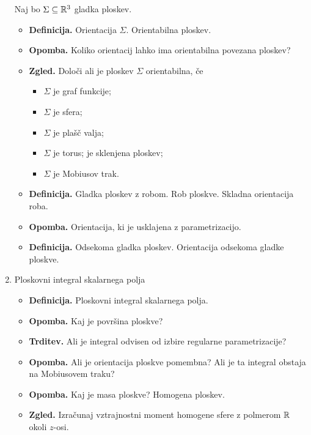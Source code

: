 \begin{enumerate}
    Naj bo \(\Sigma \subseteq \mathbb{R}^3\) gladka ploskev.
    \begin{itemize}
        \item \textbf{Definicija.} Orientacija \(\Sigma\). Orientabilna ploskev.
        \item \textbf{Opomba.} Koliko orientacij lahko ima orientabilna povezana ploskev?
        \item \textbf{Zgled.} Določi ali je ploskev \(\Sigma\) orientabilna, če 
        \begin{itemize}
            \item \(\Sigma\) je graf funkcije;
            \item \(\Sigma\) je sfera;
            \item \(\Sigma\) je plašč valja;
            \item \(\Sigma\) je torus; je sklenjena ploskev;
            \item \(\Sigma\) je Mobiusov trak.
        \end{itemize}
        \item \textbf{Definicija.} Gladka ploskev z robom. Rob ploskve. Skladna orientacija roba.
        \item \textbf{Opomba.} Orientacija, ki je usklajena z parametrizacijo.
        \item \textbf{Definicija.} Odsekoma gladka ploskev. Orientacija odsekoma gladke ploskve.
    \end{itemize}

    \item Ploskovni integral skalarnega polja
    \begin{itemize}
        \item \textbf{Definicija.} Ploskovni integral skalarnega polja.
        \item \textbf{Opomba.} Kaj je površina ploskve?
        \item \textbf{Trditev.} Ali je integral odvisen od izbire regularne parametrizacije?
        \item \textbf{Opomba.} Ali je orientacija ploskve pomembna? Ali je ta integral obstaja na Mobiusovem traku?
        \item \textbf{Opomba.} Kaj je masa ploskve? Homogena ploskev.
        \item \textbf{Zgled.} Izračunaj vztrajnostni moment homogene sfere z polmerom \(\mathbb{R}\) okoli \(z\)-osi.
    \end{itemize}


\end{enumerate}
